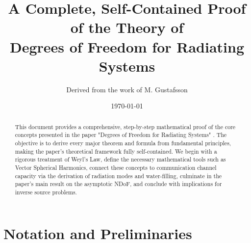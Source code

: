 \documentclass[12pt,a4paper]{article}
\theoremstyle{definition}
\begin{document}
\title{\bf A Complete, Self-Contained Proof of the Theory of \\ Degrees of Freedom for Radiating Systems}
\author{Derived from the work of M. Gustafsson \cite{Gustafsson2025}}
\date{\today}
\maketitle

\begin{abstract}
This document provides a comprehensive, step-by-step mathematical proof of the core concepts presented in the paper "Degrees of Freedom for Radiating Systems" \cite{Gustafsson2025}. The objective is to derive every major theorem and formula from fundamental principles, making the paper's theoretical framework fully self-contained. We begin with a rigorous treatment of Weyl's Law, define the necessary mathematical tools such as Vector Spherical Harmonics, connect these concepts to communication channel capacity via the derivation of radiation modes and water-filling, culminate in the paper's main result on the asymptotic NDoF, and conclude with implications for inverse source problems.
\end{abstract}

\tableofcontents
\newpage

\section{Notation and Preliminaries}
\end{document}
